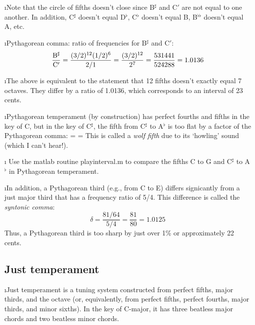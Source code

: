 \i Note that the circle of fifths doesn't close since
B$^\sharp$ and C$'$ are not equal to one another.
In addition, C$^\sharp$ doesn't equal D$^\flat$,
C$^\flat$ doesn't equal B, B$^{\flat\flat}$ doesn't equal A,
etc.

\i Pythagorean comma: ratio of frequencies for B$^\sharp$
and C$'$:
%
\begin{equation}
\frac{{\rm B}^\sharp}{{\rm C}'}
= \frac{(3/2)^{12} (1/2)^6}{2/1} 
= \frac{(3/2)^{12}}{2^7}
= \frac{531441}{524288} 
= 1.0136
\end{equation}
%

\i The above is equivalent to the statement that 
12 fifths doesn't exactly equal 7 octaves.
They differ by a ratio of 1.0136, which corresponds to
an interval of 23 cents.

\i Pythagorean temperament (by construction)
has perfect fourths and fifths in the key of C, 
but in the key of C$^\sharp$, the
fifth from C$^\sharp$ to A$^\flat$ 
is too flat by a factor of the Pythagorean comma:
%
\be
{}=
= 
\ee
%
This is called a {\em wolf fifth} due to its `howling' sound
(which I can't hear!).

\i \demo
Use the matlab routine playinterval.m to compare the 
fifths C to G and C$^\sharp$ to A$^\flat$ in 
Pythagorean temperament.

\i In addition, a Pythagorean third (e.g., from C to E)
differs signicantly 
from a just major third that has a frequency ratio of 5/4.
This difference is called the {\em syntonic comma}:
%
\begin{equation}
\delta
=\frac{81/64}{5/4} 
=\frac{81}{80}
= 1.0125
\end{equation}
%
Thus, a Pythagorean third is too sharp by just over 
1\% or approximately 22 cents.

\ei

\subsection{Just temperament}
\bi

\i Just temperament is a tuning system constructed 
from perfect fifths, major thirds, and the octave 
(or, equivalently, from perfect fifths, perfect fourths,
major thirds, and minor sixths).
In the key of C-major, it has three beatless 
major chords and two beatless minor chords.

